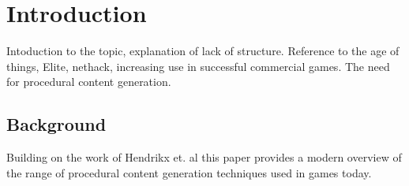 \documentclass{./acm_proc_article-sp}
\begin{document}
\begin{abstract}
\end{abstract}




\section{Introduction}
Intoduction to the topic, explanation of lack of structure. Reference to the age of things, Elite\cite{elite}, nethack, increasing use in successful commercial games. The need for procedural content generation.

\subsection{Background}
Building on the work of Hendrikx et. al \cite{hendrikx2012procedural} this paper provides a modern overview of the range of procedural content generation techniques used in games today.
\end{document}
